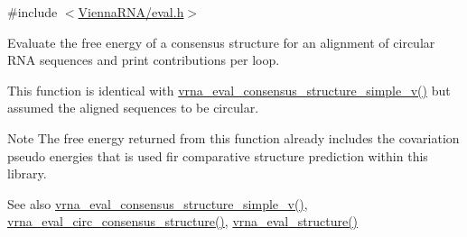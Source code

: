 {\ttfamily \#include $<$\hyperlink{eval_8h}{Vienna\+R\+N\+A/eval.\+h}$>$}



Evaluate the free energy of a consensus structure for an alignment of circular R\+NA sequences and print contributions per loop. 

This function is identical with \hyperlink{group__eval_gad88927c62ab0a8b534e078e44be1b36e}{vrna\+\_\+eval\+\_\+consensus\+\_\+structure\+\_\+simple\+\_\+v()} but assumed the aligned sequences to be circular.

\begin{DoxyNote}{Note}
The free energy returned from this function already includes the covariation pseudo energies that is used fir comparative structure prediction within this library.
\end{DoxyNote}
\begin{DoxySeeAlso}{See also}
\hyperlink{group__eval_gad88927c62ab0a8b534e078e44be1b36e}{vrna\+\_\+eval\+\_\+consensus\+\_\+structure\+\_\+simple\+\_\+v()}, \hyperlink{group__eval_gac96577cf232c71160f762737a994b7c6}{vrna\+\_\+eval\+\_\+circ\+\_\+consensus\+\_\+structure()}, \hyperlink{group__eval_ga58f199f1438d794a265f3b27fc8ea631}{vrna\+\_\+eval\+\_\+structure()}
\end{DoxySeeAlso}

